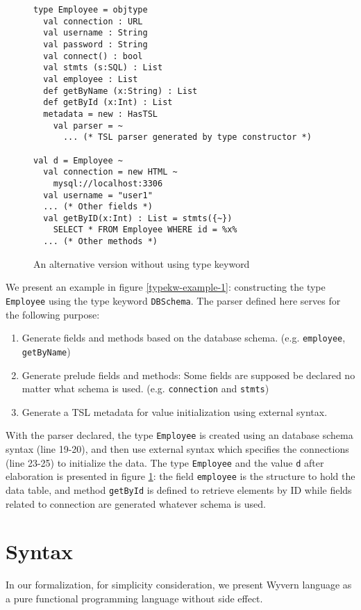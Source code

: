 \documentclass{sig-alternate}
\begin{document}
\begin{figure}[ht]
\begin{lstlisting}[style=wyvern]
type Employee = objtype
  val connection : URL
  val username : String
  val password : String
  val connect() : bool
  val stmts (s:SQL) : List
  val employee : List
  def getByName (x:String) : List
  def getById (x:Int) : List
  metadata = new : HasTSL
    val parser = ~
      ... (* TSL parser generated by type constructor *)

val d = Employee ~
  val connection = new HTML ~
    mysql://localhost:3306
  val username = "user1"
  ... (* Other fields *)
  val getByID(x:Int) : List = stmts({~})
    SELECT * FROM Employee WHERE id = %x%
  ... (* Other methods *)
\end{lstlisting}
\vspace{-8px}
\caption{An alternative version without using type keyword}
\vspace{-10px}
\label{typekw-example-2}
\end{figure}
We present an example in figure \ref{typekw-example-1}: constructing the type \verb|Employee| using the type keyword \verb|DBSchema|. The parser defined here serves for the following purpose:
\begin{enumerate}\setlength{\itemsep}{0pt}
\item Generate fields and methods based on the database schema. (e.g. \verb|employee|, \verb|getByName|)
\item Generate prelude fields and methods: Some fields are supposed be declared no matter what schema is used. (e.g. \verb|connection| and \verb|stmts|)
\item Generate a TSL metadata for value initialization using external syntax. 
\end{enumerate}
With the parser declared, the type \verb|Employee| is created using an database schema syntax (line 19-20), and then use external syntax which specifies the connections (line 23-25) to initialize the data. The type \verb|Employee| and the value \verb|d| after elaboration is presented in figure \ref{typekw-example-2}: the field \verb|employee| is the structure to hold the data table, and method \verb|getById| is defined to retrieve elements by ID while fields related to connection are generated whatever schema is used.


\section{Syntax}
In our formalization, for simplicity consideration, we present Wyvern language as a pure functional programming language without side effect.
\end{document}
